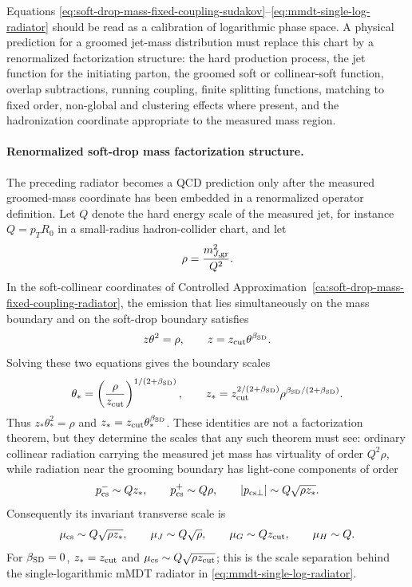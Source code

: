 Equations
\eqref{eq:soft-drop-mass-fixed-coupling-sudakov}--\eqref{eq:mmdt-single-log-radiator}
should be read as a calibration of logarithmic phase space.  A physical
prediction for a groomed jet-mass distribution must replace this chart by a
renormalized factorization structure: the hard production process, the jet
function for the initiating parton, the groomed soft or collinear-soft
function, overlap subtractions, running coupling, finite splitting functions,
matching to fixed order, non-global and clustering effects where present, and
the hadronization coordinate appropriate to the measured mass region.

\paragraph{Renormalized soft-drop mass factorization structure.}
The preceding radiator becomes a QCD prediction only after the measured
groomed-mass coordinate has been embedded in a renormalized operator
definition.
Let \(Q\) denote the hard energy scale of the measured jet, for instance
\(Q=p_T R_0\) in a small-radius hadron-collider chart, and let
\[
  \rho=\frac{m_{J,{\rm gr}}^2}{Q^2}.
\]
In the soft-collinear coordinates of
Controlled Approximation~\ref{ca:soft-drop-mass-fixed-coupling-radiator}, the
emission that lies simultaneously on the mass boundary and on the soft-drop
boundary satisfies
\[
  z\theta^2=\rho,
  \qquad
  z=z_{\rm cut}\theta^{\beta_{\rm SD}}.
\]
Solving these two equations gives the boundary scales
\begin{equation}
  \theta_*=
  \left(\frac{\rho}{z_{\rm cut}}\right)^{1/(2+\beta_{\rm SD})},
  \qquad
  z_*=
  z_{\rm cut}^{2/(2+\beta_{\rm SD})}
  \rho^{\beta_{\rm SD}/(2+\beta_{\rm SD})}.
  \label{eq:soft-drop-boundary-scales}
\end{equation}
Thus \(z_*\theta_*^2=\rho\) and \(z_*=z_{\rm cut}\theta_*^{\beta_{\rm SD}}\).
These identities are not a factorization theorem, but they determine the
scales that any such theorem must see: ordinary collinear radiation carrying
the measured jet mass has virtuality of order \(Q^2\rho\), while radiation
near the grooming boundary has light-cone components of order
\[
  p_{\rm cs}^-\sim Qz_*,
  \qquad
  p_{\rm cs}^+\sim Q\rho,
  \qquad
  |p_{{\rm cs}\perp}|\sim Q\sqrt{\rho z_*}.
\]
Consequently its invariant transverse scale is
\begin{equation}
  \mu_{\rm cs}\sim Q\sqrt{\rho z_*},
  \qquad
  \mu_J\sim Q\sqrt{\rho},
  \qquad
  \mu_G\sim Qz_{\rm cut},
  \qquad
  \mu_H\sim Q .
  \label{eq:soft-drop-natural-scales}
\end{equation}
For \(\beta_{\rm SD}=0\), \(z_*=z_{\rm cut}\) and
\(\mu_{\rm cs}\sim Q\sqrt{\rho z_{\rm cut}}\); this is the scale separation
behind the single-logarithmic mMDT radiator in
\eqref{eq:mmdt-single-log-radiator}.

